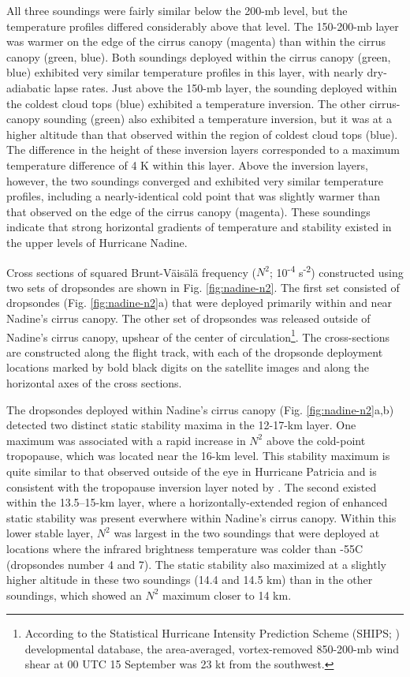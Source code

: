 All three soundings were fairly similar below the 200-mb level, but the temperature profiles differed considerably above that level.
The 150-200-mb layer was warmer on the edge of the cirrus canopy (magenta) than within the cirrus canopy (green, blue).
Both soundings deployed within the cirrus canopy (green, blue) exhibited very similar temperature profiles in this layer, with nearly dry-adiabatic lapse rates.
Just above the 150-mb layer, the sounding deployed within the coldest cloud tops (blue) exhibited a temperature inversion.
The other cirrus-canopy sounding (green) also exhibited a temperature inversion, but it was at a higher altitude than that observed within the region of coldest cloud tops (blue).
The difference in the height of these inversion layers corresponded to a maximum temperature difference of 4 K within this layer.
Above the inversion layers, however, the two soundings converged and exhibited very similar temperature profiles, including a nearly-identical cold point that was slightly warmer than that observed on the edge of the cirrus canopy (magenta).
These soundings indicate that strong horizontal gradients of temperature and stability existed in the upper levels of Hurricane Nadine.

Cross sections of squared Brunt-V{\"a}is{\"a}l{\"a} frequency ($N^2$; 10\textsuperscript{-4} s\textsuperscript{-2}) constructed using two sets of dropsondes are shown in Fig. \ref{fig:nadine-n2}.
The first set consisted of dropsondes (Fig. \ref{fig:nadine-n2}a) that were deployed primarily within and near Nadine's cirrus canopy.
The other set of dropsondes was released outside of Nadine's cirrus canopy, upshear of the center of circulation\footnote{According to the Statistical Hurricane Intensity Prediction Scheme (SHIPS; \citeauthor{DeMariaetal2005} \citeyear{DeMariaetal2005}) developmental database, the area-averaged, vortex-removed 850-200-mb wind shear at 00 UTC 15 September was 23 kt from the southwest.}.
The cross-sections are constructed along the flight track, with each of the dropsonde deployment locations marked by bold black digits on the satellite images and along the horizontal axes of the cross sections.

The dropsondes deployed within Nadine's cirrus canopy (Fig. \ref{fig:nadine-n2}a,b) detected two distinct static stability maxima in the 12-17-km layer.
One maximum was associated with a rapid increase in $N^2$ above the cold-point tropopause, which was located near the 16-km level.
This stability maximum is quite similar to that observed outside of the eye in Hurricane Patricia \citep{DuranMolinari2018} and is consistent with the tropopause inversion layer noted by \cite{Wirth2003}.
The second existed within the 13.5--15-km layer, where a horizontally-extended region of enhanced static stability was present everwhere within Nadine's cirrus canopy.
Within this lower stable layer, $N^2$ was largest in the two soundings that were deployed at locations where the infrared brightness temperature was colder than -55\textdegree{}C (dropsondes number 4 and 7).
The static stability also maximized at a slightly higher altitude in these two soundings (14.4 and 14.5 km) than in the other soundings, which showed an $N^2$ maximum closer to 14 km.

